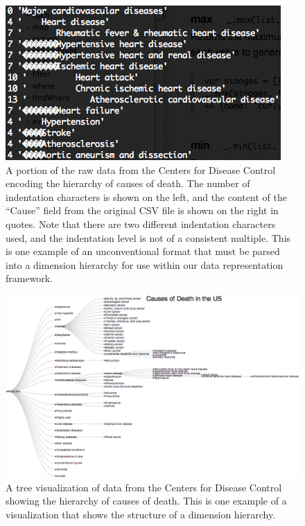 \documentclass[12pt]{article}
\begin{document}
\begin{doublespace}
\begin{figure}[h!]
  \centering
  \includegraphics[width=\textwidth]{figures/cardiovascularDiseaseRawTree.png}
  \caption[Cardiovascular disease raw tree.]
   {A portion of the raw data from the Centers for Disease Control encoding the hierarchy of causes of death. The number of indentation characters is shown on the left, and the content of the ``Cause'' field from the original CSV file is shown on the right in quotes. Note that there are two different indentation characters used, and the indentation level is not of a consistent multiple. This is one example of an unconventional format that must be parsed into a dimension hierarchy for use within our data representation framework.}
  \label{fig:cardiovascularDiseaseRawTree}
\end{figure}

\begin{figure}[h!]
  \centering
  \includegraphics[width=\textwidth]{figures/mortalityVisTree.png}
  \caption[Cause of death tree visualization.]
   {A tree visualization of data from the Centers for Disease Control showing the hierarchy of causes of death. This is one example of a visualization that shows the structure of a dimension hierarchy.}
  \label{fig:mortalityVisTree}
\end{figure}


\end{doublespace}
\end{document}
